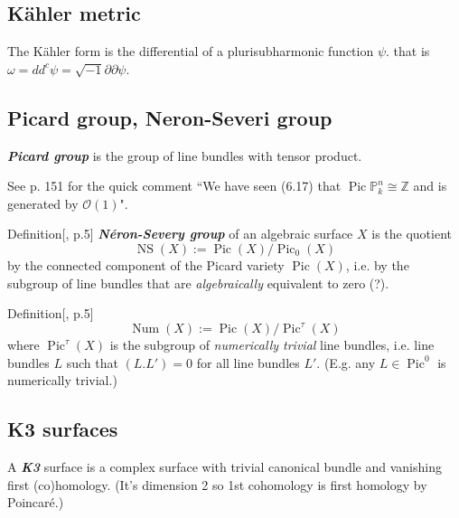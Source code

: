\subsection{Kähler metric}
The Kähler form is the differential of a plurisubharmonic function \(\psi\). that is \(\omega=d d^c \psi=\sqrt{-1} \partial \partial \psi\).

\subsection{Picard group, Neron-Severi group}

\begin{defn}[dani]\leavevmode
\textit{\textbf{Picard group}} is the group of line bundles with tensor product.
\end{defn}

\begin{remark}\leavevmode
See \cite{hart} p. 151 for the quick comment ``We have seen (6.17) that \(\operatorname{Pic}\mathbb{P}^n_k \cong\mathbb{Z}\) and is generated by \(\mathcal{O}(1)\)".
\end{remark}

\begin{thing4}{Definition}[\cite{huk}, p.5]\leavevmode
\textit{\textbf{Néron-Severy group}} of an algebraic surface \(X\) is the quotient
\[\operatorname{NS}(X):=\operatorname{Pic}(X) /\operatorname{Pic}_0(X)\]
by the connected component of the Picard variety \(\operatorname{Pic}(X)\), i.e. by the subgroup of line bundles that are \textit{algebraically} equivalent to zero (?).
\end{thing4}

\begin{thing4}{Definition}[\cite{huk}, p.5]\label{prop:}\leavevmode
\[\operatorname{Num}(X):=\operatorname{Pic}(X)/\operatorname{Pic}^\tau(X)\]
where \(\operatorname{Pic}^\tau(X)\) is the subgroup of \textit{numerically trivial} line bundles, i.e. line bundles \(L\) such that \((L.L')=0\) for all line bundles \(L'\). (E.g. any  \(L \in \operatorname{Pic}^0\) is numerically trivial.) 
\end{thing4}

\subsection{K3 surfaces}
\begin{defn}[dani]\leavevmode
A \textit{\textbf{K3}} surface is a complex surface with trivial canonical bundle and vanishing first (co)homology. (It's dimension 2 so 1st cohomology is first homology by Poincaré.)
\end{defn}

